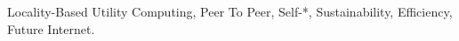 \begin{keywords}
Locality-Based Utility Computing, 
Peer To Peer,
Self-*,
Sustainability,
Efficiency,
Future Internet.
\end{keywords}
